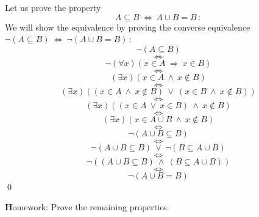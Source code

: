 \documentclass[11pt,paper=b5,footinclude,headinclude]{scrbook} %
\def\ali {{~\vee~}}
\def\inn {{~\wedge~}}
\def\sledi {{~\Rightarrow~}}
\def\cee {{~\Leftrightarrow~}}
\theoremstyle{remark}
\theoremstyle{definition} %
\begin{document}
\bigskip
Let us prove the property
$$A\subseteq B\cee A\cup B = B\,:$$
\medskip
We will show the equivalence by proving the converse equivalence
$\neg(A\subseteq B)\cee \neg(A\cup B = B)\,:$
$$\neg(A\subseteq B)$$
$$\cee$$
$$\neg(\forall x)(x\in A\sledi x\in B)$$
$$\cee$$
$$(\exists x)(x\in A \inn x\not\in B)$$
$$\cee$$
$$(\exists x)((x\in A \inn x\not\in B) \ali (x\in B \inn x\not\in B))$$
$$\cee$$
$$(\exists x)((x\in A \ali x\in B)\inn x\not\in B)$$
$$\cee$$
$$(\exists x)(x\in A\cup B\inn x\not\in B)$$
$$\cee$$
$$\neg(A\cup B \subseteq B)$$
$$\cee$$
$$\neg(A\cup B \subseteq B) \ali \neg(B \subseteq A\cup B) $$
$$\cee$$
$$\neg((A\cup B \subseteq B)\inn (B \subseteq A\cup B))$$
$$\cee$$
$$\neg(A\cup B = B)$$
\qed

\bigskip
{\textbf Homework:} Prove the remaining properties.

\bigskip

%
%
%
%
%
%
%
%
%
%
%
%
%
\end{document}
